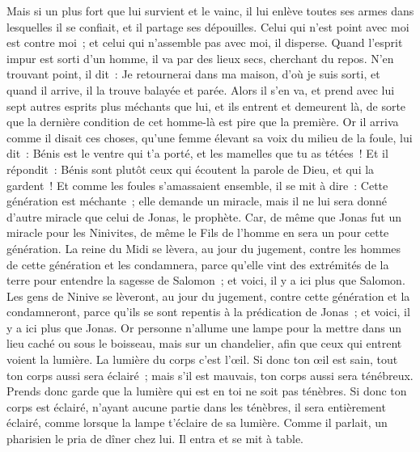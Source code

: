 \begin{multicols}{2}
Mais si un plus fort que lui survient et le vainc, il lui enlève toutes ses armes dans lesquelles il se confiait, et il partage ses dépouilles.
Celui qui n'est point avec moi est contre moi~; et celui qui n'assemble pas avec moi, il disperse.
Quand l'esprit impur est sorti d'un homme, il va par des lieux secs, cherchant du repos. N'en trouvant point, il dit~: Je retournerai dans ma maison, d'où je suis sorti,
et quand il arrive, il la trouve balayée et parée.
Alors il s'en va, et prend avec lui sept autres esprits plus méchants que lui, et ils entrent et demeurent là, de sorte que la dernière condition de cet homme-là est pire que la première.
Or il arriva comme il disait ces choses, qu'une femme élevant sa voix du milieu de la foule, lui dit~: Bénis est le ventre qui t'a porté, et les mamelles que tu as tétées~!
Et il répondit~: Bénis sont plutôt ceux qui écoutent la parole de Dieu, et qui la gardent~!
Et comme les foules s'amassaient ensemble, il se mit à dire~: Cette génération est méchante~; elle demande un miracle, mais il ne lui sera donné d'autre miracle que celui de Jonas, le prophète.
Car, de même que Jonas fut un miracle pour les Ninivites, de même le Fils de l'homme en sera un pour cette génération.
La reine du Midi se lèvera, au jour du jugement, contre les hommes de cette génération et les condamnera, parce qu'elle vint des extrémités de la terre pour entendre la sagesse de Salomon~; et voici, il y a ici plus que Salomon.
Les gens de Ninive se lèveront, au jour du jugement, contre cette génération et la condamneront, parce qu'ils se sont repentis à la prédication de Jonas~; et voici, il y a ici plus que Jonas.
Or personne n'allume une lampe pour la mettre dans un lieu caché ou sous le boisseau, mais sur un chandelier, afin que ceux qui entrent voient la lumière.
La lumière du corps c'est l'œil. Si donc ton œil est sain, tout ton corps aussi sera éclairé~; mais s'il est mauvais, ton corps aussi sera ténébreux.
Prends donc garde que la lumière qui est en toi ne soit pas ténèbres.
Si donc ton corps est éclairé, n'ayant aucune partie dans les ténèbres, il sera entièrement éclairé, comme lorsque la lampe t'éclaire de sa lumière.
Comme il parlait, un pharisien le pria de dîner chez lui. Il entra et se mit à table.

\end{multicols}
